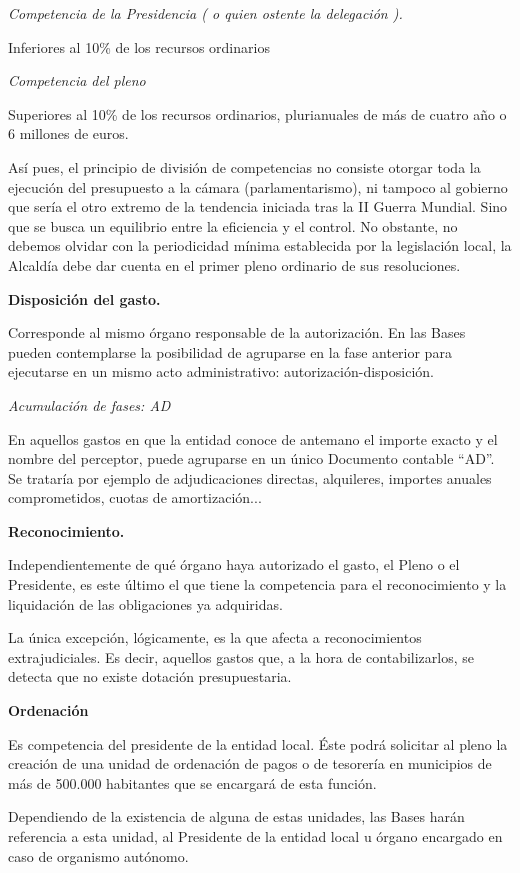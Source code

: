 \documentclass[
]{article}
\begin{document}
\emph{Competencia de la Presidencia ( o quien ostente la delegación ).}

Inferiores al 10\% de los recursos ordinarios

\emph{Competencia del pleno}

Superiores al 10\% de los recursos ordinarios, plurianuales de más de
cuatro año o 6 millones de euros.

Así pues, el principio de división de competencias no consiste otorgar
toda la ejecución del presupuesto a la cámara (parlamentarismo), ni
tampoco al gobierno que sería el otro extremo de la tendencia iniciada
tras la II Guerra Mundial. Sino que se busca un equilibrio entre la
eficiencia y el control. No obstante, no debemos olvidar con la
periodicidad mínima establecida por la legislación local, la Alcaldía
debe dar cuenta en el primer pleno ordinario de sus resoluciones.

\textbf{Disposición del gasto.}

Corresponde al mismo órgano responsable de la autorización. En las Bases
pueden contemplarse la posibilidad de agruparse en la fase anterior para
ejecutarse en un mismo acto administrativo: autorización-disposición.

\emph{Acumulación de fases: AD}

En aquellos gastos en que la entidad conoce de antemano el importe
exacto y el nombre del perceptor, puede agruparse en un único Documento
contable ``AD''. Se trataría por ejemplo de adjudicaciones directas,
alquileres, importes anuales comprometidos, cuotas de amortización...

\textbf{Reconocimiento.}

Independientemente de qué órgano haya autorizado el gasto, el Pleno o el
Presidente, es este último el que tiene la competencia para el
reconocimiento y la liquidación de las obligaciones ya adquiridas.

La única excepción, lógicamente, es la que afecta a reconocimientos
extrajudiciales. Es decir, aquellos gastos que, a la hora de
contabilizarlos, se detecta que no existe dotación presupuestaria.

\textbf{Ordenación}

Es competencia del presidente de la entidad local. Éste podrá solicitar
al pleno la creación de una unidad de ordenación de pagos o de tesorería
en municipios de más de 500.000 habitantes que se encargará de esta
función.

Dependiendo de la existencia de alguna de estas unidades, las Bases
harán referencia a esta unidad, al Presidente de la entidad local u
órgano encargado en caso de organismo autónomo.
\end{document}
